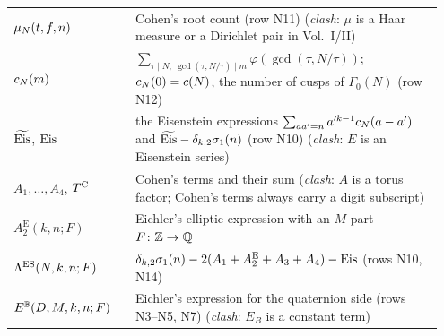 \begin{longtable}{@{}p{0.27\linewidth}p{0.68\linewidth}@{}}
$\mu_N(t,f,n)$ & Cohen's root count (row N11) (\emph{clash}: $\mu$ is a Haar measure or a Dirichlet pair in Vol.~I/II) \\
$c_N(m)$ & $\sum_{\tau\mid N,\ \gcd(\tau,N/\tau)\mid m}\varphi(\gcd(\tau,N/\tau))$; $c_N(0)=c(N)$, the number of cusps of $\Gamma_0(N)$ (row N12) \\
$\widetilde{\mathrm{Eis}}$, $\mathrm{Eis}$ & the Eisenstein expressions $\sum_{aa'=n}a'^{k-1}c_N(a-a')$ and $\widetilde{\mathrm{Eis}}-\delta_{k,2}\sigma_1(n)$ (row N10) (\emph{clash}: $E$ is an
  Eisenstein series) \\
$A_1,\dots,A_4$, $T^{\mathrm{C}}$ & Cohen's terms and their sum (\emph{clash}: $A$ is a torus factor; Cohen's terms always carry a digit subscript) \\
$A_2^{\mathrm E}(k,n;F)$ & Eichler's elliptic expression with an $M$-part $F\colon\mathbb{Z}\to\mathbb{Q}$ \\
$\Lambda^{\mathrm{ES}}(N,k,n;F)$ & $\delta_{k,2}\sigma_1(n)-2(A_1+A_2^{\mathrm E}+A_3+A_4)-\mathrm{Eis}$ (rows N10, N14) \\
$E^{\mathbb{B}}(D,M,k,n;F)$ & Eichler's expression for the quaternion side (rows N3--N5, N7) (\emph{clash}: $E_B$ is a constant term) \\
\bottomrule
\end{longtable}

